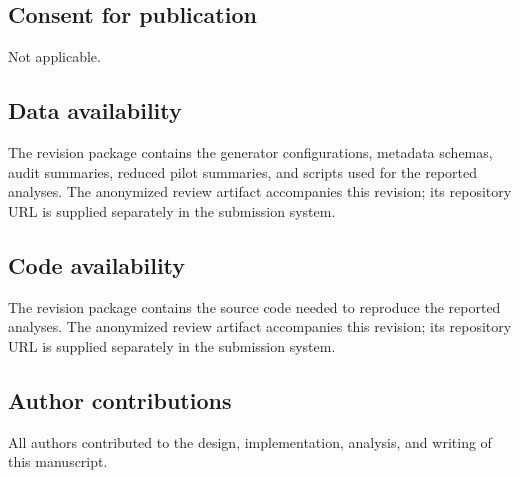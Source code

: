 \documentclass[pdflatex,sn-mathphys-num,iicol]{sn-jnl}
\begin{document}
\subsection*{Consent for publication}
Not applicable.

\subsection*{Data availability}
The revision package contains the generator configurations, metadata schemas, audit summaries, reduced pilot summaries, and scripts used for the reported analyses. The anonymized review artifact accompanies this revision; its repository URL is supplied separately in the submission system.

\subsection*{Code availability}
The revision package contains the source code needed to reproduce the reported analyses. The anonymized review artifact accompanies this revision; its repository URL is supplied separately in the submission system.

\subsection*{Author contributions}
All authors contributed to the design, implementation, analysis, and writing of this manuscript.


\end{document}
